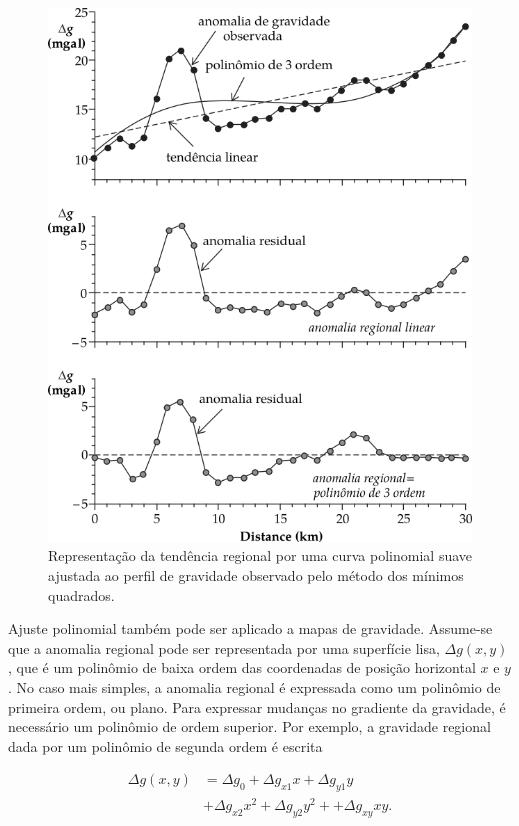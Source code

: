\documentclass[]{book}
\theoremstyle{definition}
\theoremstyle{definition}
\theoremstyle{definition}
\theoremstyle{remark}
\begin{document}
\begin{figure}

{\centering \includegraphics[width=0.8\linewidth]{fig/Fig_02.39} 

}

\caption{Representação da tendência regional por uma curva polinomial suave ajustada ao perfil de gravidade observado pelo método dos mínimos quadrados.}\label{fig:anopoli}
\end{figure}

Ajuste polinomial também pode ser aplicado a mapas de gravidade. Assume-se que a anomalia regional pode ser representada por uma superfície lisa, \(\Delta g(x, y)\), que é um polinômio de baixa ordem das coordenadas de posição horizontal \(x\) e \(y\). No caso mais simples, a anomalia regional é expressada como um polinômio de primeira ordem, ou plano. Para expressar mudanças no gradiente da gravidade, é necessário um polinômio de ordem superior. Por exemplo, a gravidade regional dada por um polinômio de segunda ordem é escrita

\begin{align}
\Delta g(x,y) &= \Delta g_0 + \Delta g_{x1} x + \Delta g_{y1} y\\
& +\Delta g_{x2} x^2 +\Delta g_{y2} y^2 ++\Delta g_{xy} xy. \label{eq:0251}
\end{align}
\end{document}
